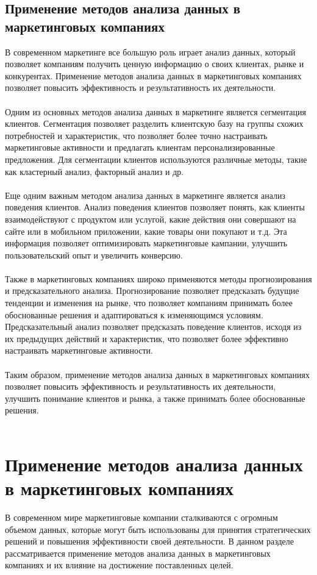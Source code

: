 \documentclass{article}
\begin{document}
\subsection{Применение методов анализа данных в маркетинговых компаниях}
В современном маркетинге все большую роль играет анализ данных, который позволяет компаниям получить ценную информацию о своих клиентах, рынке и конкурентах. Применение методов анализа данных в маркетинговых компаниях позволяет повысить эффективность и результативность их деятельности.\\
~\\
Одним из основных методов анализа данных в маркетинге является сегментация клиентов. Сегментация позволяет разделить клиентскую базу на группы схожих потребностей и характеристик, что позволяет более точно настраивать маркетинговые активности и предлагать клиентам персонализированные предложения. Для сегментации клиентов используются различные методы, такие как кластерный анализ, факторный анализ и др.\\
~\\
Еще одним важным методом анализа данных в маркетинге является анализ поведения клиентов. Анализ поведения клиентов позволяет понять, как клиенты взаимодействуют с продуктом или услугой, какие действия они совершают на сайте или в мобильном приложении, какие товары они покупают и т.д. Эта информация позволяет оптимизировать маркетинговые кампании, улучшить пользовательский опыт и увеличить конверсию.\\
~\\
Также в маркетинговых компаниях широко применяются методы прогнозирования и предсказательного анализа. Прогнозирование позволяет предсказать будущие тенденции и изменения на рынке, что позволяет компаниям принимать более обоснованные решения и адаптироваться к изменяющимся условиям. Предсказательный анализ позволяет предсказать поведение клиентов, исходя из их предыдущих действий и характеристик, что позволяет более эффективно настраивать маркетинговые активности.\\
~\\
Таким образом, применение методов анализа данных в маркетинговых компаниях позволяет повысить эффективность и результативность их деятельности, улучшить понимание клиентов и рынка, а также принимать более обоснованные решения.\\
~\\

\newpage
\section{Применение методов анализа данных в маркетинговых компаниях}
В современном мире маркетинговые компании сталкиваются с огромным объемом данных, которые могут быть использованы для принятия стратегических решений и повышения эффективности своей деятельности. В данном разделе рассматривается применение методов анализа данных в маркетинговых компаниях и их влияние на достижение поставленных целей.
\end{document}
